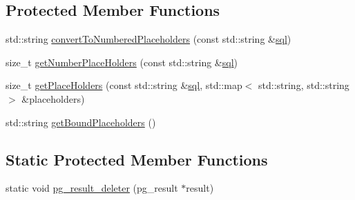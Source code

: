 \subsection*{Protected Member Functions}
\begin{DoxyCompactItemize}
\item 
std\+::string \hyperlink{classdbo_1_1stmt_1_1_prepared_statement_a791835c0fb71225cd2c1bd8dd576b247}{convert\+To\+Numbered\+Placeholders} (const std\+::string \&\hyperlink{classdbo_1_1stmt_1_1_prepared_statement_a5413f8367e7cfcba4a2dfedc11726509}{sql})
\item 
size\+\_\+t \hyperlink{classdbo_1_1stmt_1_1_prepared_statement_a9e094e897a46d7876081c58eab3c8a0c}{get\+Number\+Place\+Holders} (const std\+::string \&\hyperlink{classdbo_1_1stmt_1_1_prepared_statement_a5413f8367e7cfcba4a2dfedc11726509}{sql})
\item 
size\+\_\+t \hyperlink{classdbo_1_1stmt_1_1_prepared_statement_ae50936c7ba9f917080a85b16008b0ff3}{get\+Place\+Holders} (const std\+::string \&\hyperlink{classdbo_1_1stmt_1_1_prepared_statement_a5413f8367e7cfcba4a2dfedc11726509}{sql}, std\+::map$<$ std\+::string, std\+::string $>$ \&placeholders)
\item 
std\+::string \hyperlink{classdbo_1_1stmt_1_1_prepared_statement_a647184158cda629d94c8e4dc49b245b8}{get\+Bound\+Placeholders} ()
\end{DoxyCompactItemize}
\subsection*{Static Protected Member Functions}
\begin{DoxyCompactItemize}
\item 
static void \hyperlink{classdbo_1_1stmt_1_1_prepared_statement_a52ad363c227383fefab22260545affea}{pg\+\_\+result\+\_\+deleter} (pg\+\_\+result $\ast$result)
\end{DoxyCompactItemize}
